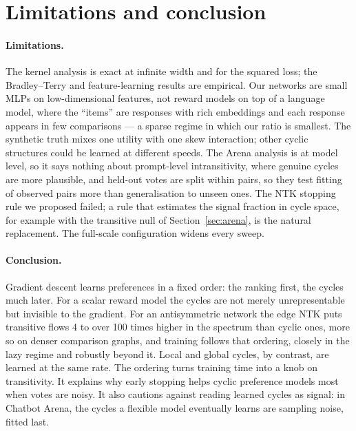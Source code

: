 \section{Limitations and conclusion}
\label{sec:conclusion}

\paragraph{Limitations.} The kernel analysis is exact at infinite width and
for the squared loss; the Bradley--Terry and feature-learning results are
empirical. Our networks are small MLPs on low-dimensional features, not reward
models on top of a language model, where the ``items'' are responses with rich
embeddings and each response appears in few comparisons --- a sparse regime in
which our ratio is smallest. The synthetic truth mixes one utility with one
skew interaction; other cyclic structures could be learned at different
speeds. The Arena analysis is at model level, so it says nothing about
prompt-level intransitivity, where genuine cycles are more plausible, and
held-out votes are split within pairs, so they test fitting of observed pairs
more than generalisation to unseen ones. The NTK stopping rule we proposed
failed; a rule that estimates the signal fraction in cycle space, for example
with the transitive null of Section~\ref{sec:arena}, is the natural
replacement. The full-scale configuration widens every sweep.

\paragraph{Conclusion.} Gradient descent learns preferences in a fixed order:
the ranking first, the cycles much later. For a scalar reward model the
cycles are not merely unrepresentable but invisible to the gradient. For an
antisymmetric network the edge NTK puts transitive flows 4 to over 100 times
higher in the spectrum than cyclic ones, more so on denser comparison graphs,
and training follows that ordering, closely in the lazy regime and robustly
beyond it. Local and global cycles, by contrast, are learned at the same
rate. The ordering turns training time into a knob on transitivity. It
explains why early stopping helps cyclic preference models most when votes are
noisy. It also cautions against reading learned cycles as signal: in Chatbot
Arena, the cycles a flexible model eventually learns are sampling noise,
fitted last.
